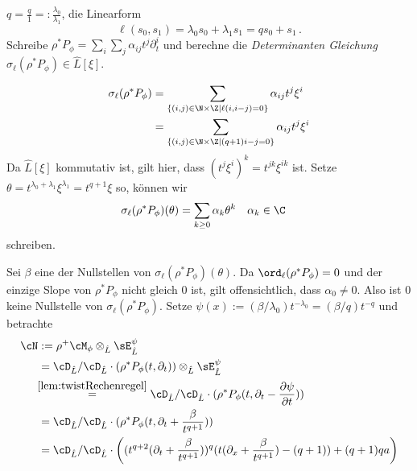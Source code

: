$q=\frac{q}{1}=:\frac{\lambda_0}{\lambda_1}$, die Linearform
\[
\ell(s_0,s_1)=\lambda_0s_0+\lambda_1s_1=qs_0+s_1 \,.
\]
Schreibe $\rho^*P_{\phi}=\sum_i\sum_j\alpha_{ij}t^j\partial_t^i$ und berechne
die \emph{Determinanten Gleichung} $\sigma_\ell(\rho^*P_{\phi})\in \hat L[\xi]$.
\begin{comment}
Schon gezeigt, das $ord_\ell = 0$?
\end{comment}
\begin{align*}
\sigma_\ell(\rho^*P_{\phi})
  &= \sum_{\{(i,j)\in\N\times\Z \mid \ell(i,i-j)=0\}}\alpha_{ij}t^j\xi^i\\
  &= \sum_{\{(i,j)\in\N\times\Z \mid (q+1)i-j=0\}}\alpha_{ij}t^j\xi^i
\end{align*}
Da $\hat L[\xi]$ kommutativ ist, gilt hier, dass $(t^j\xi^i)^k=t^{jk}\xi^{ik}$
ist.  Setze $\theta=t^{\lambda_0+\lambda_1}\xi^{\lambda_1}=t^{q+1}\xi$ so,
können wir
\begin{align*}
\sigma_\ell(\rho^*P_{\phi})(\theta) 
  &= \sum_{k\geq 0}\alpha_k\theta^k & & \alpha_k\in\C
\end{align*}
schreiben.
\begin{comment}
, welches wir als nächsten Schritt faktorisieren
\[
\sigma_\ell(\rho^*P_\phi)
  =\epsilon\prod_{\beta\mbox{ Nullstelle}}(\theta-\beta)^{\gamma_\beta}\,.
\]
Wobei $\epsilon\in\C^\times$
eine Konstante ist.
\end{comment}
Sei $\beta$  eine der Nullstellen von $\sigma_\ell(\rho^*P_{\phi})(\theta)$.
Da $\ord_\ell(\rho^*P_\phi)=0$ und der einzige Slope von $\rho^*P_\phi$ nicht
gleich $0$ ist, gilt offensichtlich, dass $\alpha_0\neq0$. Also ist $0$ keine
Nullstelle von $\sigma_\ell(\rho^*P_\phi)$.
Setze $\psi(x):=(\beta/\lambda_0)t^{-\lambda_0}=(\beta/q)t^{-q}$ und
betrachte
\begin{align*}
\cN&:=\rho^+\cM_\phi\otimes_{\hat L}\sE_{\hat L}^\psi
\\&= \cD_{\hat L}/\cD_{\hat L}\cdot(\rho^*P_{\phi}(t,\partial_t))
    \otimes_{\hat L}\sE_{\hat L}^\psi
\\&\!\!\overset{\ref{lem:twistRechenregel}}{=}
  \cD_{\hat L}/\cD_{\hat L}\cdot(\rho^*P_{\phi}(t,\partial_t-\frac{\partial
  \psi}{\partial t}))
\\&=\cD_{\hat L}/\cD_{\hat
    L}\cdot(\rho^*P_{\phi}(t,\partial_t+\frac{\beta}{t^{q+1}}))
\\&=\cD_{\hat L}/\cD_{\hat L}\cdot
    \left((t^{q+2}(\partial_t+\frac{\beta}{t^{q+1}}))^{q}
    (t(\partial_x+\frac{\beta}{t^{q+1}})-(q+1))+(q+1)qa \right)
\end{align*}
